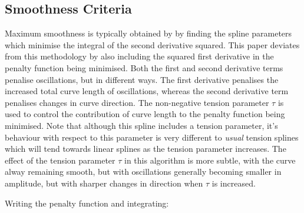 \documentclass{article}
\begin{document}
\subsection{Smoothness Criteria}
Maximum smoothness is typically obtained by by finding the spline 
parameters which minimise the integral of the second derivative squared. This paper deviates from
this methodology by also including the squared first derivative in the penalty function being
minimised. Both the first and second derivative terms penalise oscillations, but in different
ways. The first derivative penalises the increased total curve length of oscillations, whereas the second
derivative term penalises changes in curve direction. The non-negative tension parameter 
$\tau$ is used to control the contribution of curve length to the penalty function being minimised.
Note that although this spline includes a tension parameter, it's behaviour with respect to this
parameter is very different to \emph{usual} tension splines which will tend towards linear splines
as the tension parameter increases. The effect of the tension parameter $\tau$ in this 
algorithm is more subtle, with the curve alway remaining smooth, but with oscillations generally
becoming smaller in amplitude, but with sharper changes in direction when $\tau$ is increased.

\bigskip

Writing the penalty function and integrating:
\end{document}
